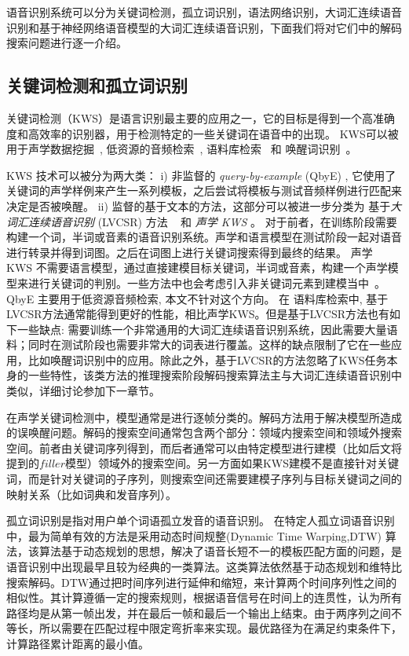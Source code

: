 语音识别系统可以分为关键词检测，孤立词识别，语法网络识别，大词汇连续语音识别和基于神经网络语音模型的大词汇连续语音识别，下面我们将对它们中的解码搜索问题进行逐一介绍。

\subsection{关键词检测和孤立词识别}
\label{chap:intro-kws-dec}

关键词检测（KWS）是语言识别最主要的应用之一，它的目标是得到一个高准确度和高效率的识别器，用于检测特定的一些关键词在语音中的出现。
KWS可以被用于声学数据挖掘~\cite{zhou2005data}, 低资源的音频检索~\cite{shen2009comparison}, 
语料库检索~\cite{garofolo2000trec} 和 唤醒词识别~\cite{chen2014small}。

KWS 技术可以被分为两大类：
i) 非监督的  {\em query-by-example} (QbyE) \cite{zhang2009unsupervised,barakat2012improved,chen2015query}, 它使用了关键词的声学样例来产生一系列模板，之后尝试将模板与测试音频样例进行匹配来决定是否被唤醒。
ii) 监督的基于文本的方法，这部分可以被进一步分类为  基于{\em 大词汇连续语音识别} (LVCSR)  方法 ~\cite{garofolo2000trec,ng2000subword} 和  {\em 声学 KWS} \cite{mandal2014recent}。
对于前者，在训练阶段需要构建一个词，半词或音素的语音识别系统。声学和语言模型在测试阶段一起对语音进行转录并得到词图。之后在词图上进行关键词搜索得到最终的结果。
声学 KWS 不需要语言模型，通过直接建模目标关键词，半词或音素，构建一个声学模型来进行关键词的判别。一些方法中也会考虑引入非关键词元素到建模当中~\cite{sukkar1996utterance}。
QbyE 主要用于低资源音频检索, 本文不针对这个方向。 
在 语料库检索中, 基于LVCSR方法通常能得到更好的性能，相比声学KWS。但是基于LVCSR方法也有如下一些缺点: 需要训练一个非常通用的大词汇连续语音识别系统，因此需要大量语料；同时在测试阶段也需要非常大的词表进行覆盖。这样的缺点限制了它在一些应用，比如唤醒词识别中的应用。除此之外，基于LVCSR的方法忽略了KWS任务本身的一些特性，该类方法的推理搜索阶段解码搜索算法主与大词汇连续语音识别中类似，详细讨论参加下一章节。

在声学关键词检测中，模型通常是进行逐帧分类的。解码方法用于解决模型所造成的误唤醒问题。解码的搜索空间通常包含两个部分：领域内搜索空间和领域外搜索空间。前者由关键词序列得到，而后者通常可以由特定模型进行建模（比如后文将提到的$filler$模型）领域外的搜索空间。另一方面如果KWS建模不是直接针对关键词，而是针对关键词的子序列，则搜索空间还需要建模子序列与目标关键词之间的映射关系（比如词典和发音序列）。


孤立词识别是指对用户单个词语孤立发音的语音识别。
在特定人孤立词语音识别中，最为简单有效的方法是采用动态时间规整(Dynamic Time Warping,DTW) 算法，该算法基于动态规划的思想，解决了语音长短不一的模板匹配方面的问题，是语音识别中出现最早且较为经典的一类算法。这类算法依然基于动态规划和维特比搜索解码。DTW通过把时间序列进行延伸和缩短，来计算两个时间序列性之间的相似性。其计算遵循一定的搜索规则，根据语音信号在时间上的连贯性，认为所有路径均是从第一帧出发，并在最后一帧和最后一个输出上结束。由于两序列之间不等长，所以需要在匹配过程中限定弯折率来实现。最优路径为在满足约束条件下，计算路径累计距离的最小值。



